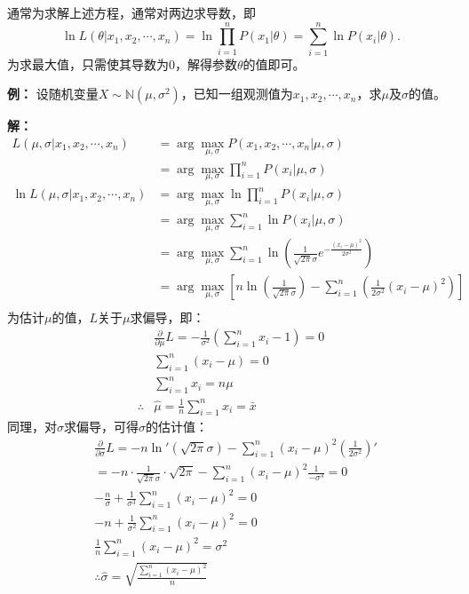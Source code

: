 \documentclass[12pt,a4paper]{article}
\begin{document}
  通常为求解上述方程，通常对两边求导数，即
  $$
  \ln L(\theta|x_1,x_2,\cdots,x_n) = \ln \prod\limits_{i=1}^n P(x_1|\theta) = \sum_{i=1}^n \ln P(x_i|\theta).
  $$
  为求最大值，只需使其导数为0，解得参数$\theta$的值即可。

  \textbf{例：} 设随机变量$X \sim \mathbb{N}(\mu, \sigma^2)$，已知一组观测值为$x_1, x_2,\cdots, x_n$，求$\mu$及$\sigma$的值。
  
  \textbf{解：} 
  $$\begin{aligned}
    L(\mu, \sigma|x_1, x_2,\cdots, x_n) &= \arg\max_{\mu, \sigma} P(x_1, x_2,\cdots, x_n | \mu, \sigma) \\
    &= \arg\max_{\mu, \sigma} \prod _{i=1}^n P(x_i|\mu, \sigma) \\ 
    \ln L(\mu, \sigma|x_1, x_2,\cdots, x_n) &= \arg\max_{\mu, \sigma}\ln  \prod _{i=1}^n P(x_i|\mu, \sigma) \\ 
    &= \arg\max_{\mu, \sigma} \sum_{i=1}^n \ln P(x_i|\mu, \sigma) \\ 
    &= \arg\max_{\mu, \sigma} \sum_{i=1}^n \ln \left(\frac{1}{\sqrt{2\pi}\sigma}e^{-\frac{\left(x_i-\mu\right)^2}{2\sigma ^2}}\right) \\ 
    &= \arg\max_{\mu, \sigma} \left[ n \ln \left(\frac{1}{\sqrt{2\pi}\sigma}\right)- \sum_{i=1}^n \left(\frac{1}{2\sigma^2}(x_i-\mu)^2\right) \right] \\
  \end{aligned}$$
  为估计$\mu$的值，$L$关于$\mu$求偏导，即：
  $$
  \begin{aligned}
    &\frac{\partial}{\partial \mu} L = - \frac{1}{\sigma^2}\left(\sum_{i=1}^n x_i - 1 \right) = 0 \\
    &\sum_{i=1}^n (x_i - \mu ) = 0 \\ 
    &\sum_{i=1}^n x_i = n \mu \\ 
    \therefore  & \hat{\mu} = \frac{1}{n}\sum_{i=1}^n x_i = \bar{x}
  \end{aligned}
  $$
  同理，对$\sigma$求偏导，可得$\sigma$的估计值：
  $$
  \begin{aligned}
    & \frac{\partial}{\partial \sigma} L = -n \ln ' \left(\sqrt{2\pi}\sigma\right) - \sum_{i=1}^n (x_i-\mu)^2 \left(\frac{1}{2\sigma^2}\right)' \\ 
    & = -n \cdot \frac{1}{\sqrt{2\pi}\sigma} \cdot \sqrt{2\pi} - \sum_{i=1}^n (x_i-\mu)^2 \frac{1}{-\sigma^3}=0 \\ 
    & -\frac{n}{\sigma} +\frac{1}{\sigma^3} \sum_{i=1}^n (x_i-\mu)^2 = 0 \\ 
    & -n + \frac{1}{\sigma^2} \sum_{i=1}^n (x_i-\mu)^2 = 0 \\ 
    & \frac{1}{n}\sum_{i=1}^n (x_i-\mu)^2 =\sigma^2 \\ 
    & \therefore \hat{\sigma} = \sqrt{\frac{\sum_{i=1}^n (x_i-\mu)^2}{n}}
  \end{aligned}
  $$
\end{document}
